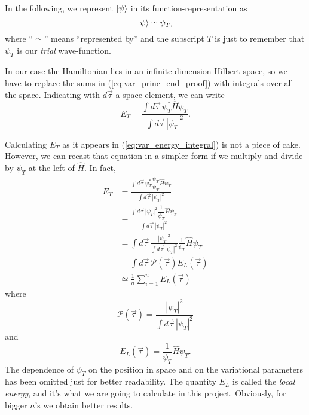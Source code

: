 In the following, we represent $\Ket{\psi}$ in its function-representation as
\begin{equation*}
	\Ket{\psi} \simeq \psi_T,
\end{equation*}
where ``$\simeq$'' means ``represented by'' and the subscript $T$ is just to remember that $\psi_T$ is our \emph{trial} wave-function.

In our case the Hamiltonian lies in an infinite-dimension Hilbert space, so we have to replace the sums in (\ref{eq:var_princ_end_proof}) with integrals over all the space. Indicating with $d\vec{\tau}$ a space element, we can write
\begin{equation}
	E_T = \frac{\int d\vec{\tau} \, \psi_T^* \hat{H} \psi_T}{\int d\vec{\tau} \, |\psi_T|^2}.
	\label{eq:var_energy_integral}
\end{equation}

Calculating $E_T$ as it appears in (\ref{eq:var_energy_integral}) is not a piece of cake. However, we can recast that equation in a simpler form if we multiply and divide by $\psi_T$ at the left of $\hat{H}$. In fact,
\begin{align}
	E_T 
	&= \frac{\int d\vec{\tau} \, \psi_T^* \dfrac{\psi_T}{\psi_T} \hat{H} \psi_T}{\int d\vec{\tau} \, |\psi_T|^2} \\
	&= \frac{\int d\vec{\tau} \, |\psi_T|^2 \dfrac{1}{\psi_T} \hat{H} \psi_T}{\int d\vec{\tau} \, |\psi_T|^2} \\
	&= \int d\vec{\tau} \, \frac{|\psi_T|^2}{\int d\vec{\tau} \, |\psi_T|^2} \frac{1}{\psi_T} \hat{H} \psi_T \\
	&= \int d\vec{\tau} \, \mathcal{P}(\vec{\tau}) E_L(\vec{\tau}) \\
	&\simeq \frac{1}{n} \sum_{i = 1}^{n} E_L(\vec{\tau})
\end{align}
where
\begin{equation}
	\mathcal{P}(\vec{\tau}) = \frac{|\psi_T|^2}{\int d\vec{\tau} \, |\psi_T|^2}
\end{equation}
and
\begin{equation}
	E_L(\vec{\tau}) = \frac{1}{\psi_T} \hat{H} \psi_T.
\end{equation}
The dependence of $\psi_T$ on the position in space and on the variational parameters has been omitted just for better readability. The quantity $E_L$ is called the \emph{local energy}, and it's what we are going to calculate in this project. Obviously, for bigger $n$'s we obtain better results.

